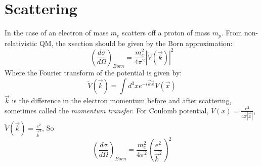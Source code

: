 \section{Scattering}
In the case of an electron of mass $m_e$ scatters off a proton of mass $m_p$. 
From non-relativistic QM, the xsection should be given by the Born approximation:
\begin{equation}
    \left(\frac{d\sigma}{d\Omega}\right)_{Born} = \frac{m_e^2}{4\pi^2}|\tilde{V}(\vec{k})|^2
\end{equation}
Where the Fourier transform of the potential is given by:
\[
    \tilde{V}(\vec{k}) = \int d^3xe^{-i\vec{k}\vec{x}}V(\vec{x})
    \]
$\vec{k}$ is the difference in the electron momentum before and after scattering, 
sometimes called the \emph{momentum transfer}. For Coulomb potential, 
$V(x) = \frac{e^2}{4\pi|\vec{x}|}$, $\tilde{V}(\vec{k}) = \frac{e^2}{\vec{k}^2}$, 
So
\[
    \left(\frac{d\sigma}{d\Omega}\right)_{Born} = \frac{m_e^2}{4\pi^2}\left(\frac{e^2}{\vec{k}^2}\right)^2
    \]

